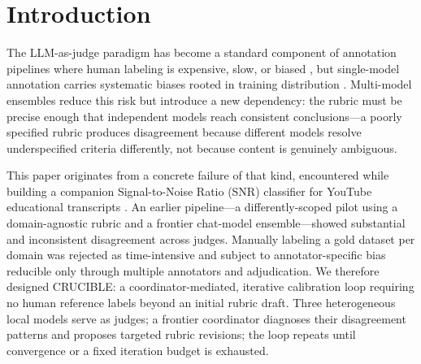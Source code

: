 \documentclass[letterpaper]{article}
\begin{document}
\begin{abstract}
further interventions---porting the calibrated rubric to a frontier judge, and
adding a reasoning step before the label---each move the optimized metric
without moving agreement with the human reference, and a reasoning step alone
moves it by $+11.6$ points. These results
locate CRUCIBLE's value not in raising raw agreement, and not in match against
human consensus, but in diagnosing whether residual disagreement is
rubric-fixable, capability-bounded, or prevalence-dominated---and in the
accompanying warning that a stopping rule defined on an uncorrected agreement
metric will terminate before agreement has been achieved. For a safety-critical
evaluation pipeline, this is the risk-relevant contribution: an operator
reading 81.7\% agreement as convergence is reading a number whose floor is
66.7\%.
\end{abstract}

\begin{links}
\end{links}

\section{Introduction}

The LLM-as-judge paradigm has become a standard component of annotation
pipelines where human labeling is expensive, slow, or biased
\citep{zheng2023judging}, but single-model annotation carries systematic
biases rooted in training distribution \citep{thakur2024judging}.
Multi-model ensembles reduce this risk but introduce a new dependency: the
rubric must be precise enough that independent models reach consistent
conclusions---a poorly specified rubric produces disagreement because
different models resolve underspecified criteria differently, not because
content is genuinely ambiguous.

This paper originates from a concrete failure of that kind, encountered
while building a companion Signal-to-Noise Ratio (SNR) classifier for
YouTube educational transcripts \citep{das2026snr}. An earlier pipeline---a differently-scoped pilot using a domain-agnostic
rubric and a frontier chat-model ensemble---showed substantial and
inconsistent disagreement across judges. Manually labeling a gold dataset per
domain was rejected as time-intensive and subject to annotator-specific bias
reducible only through multiple annotators and adjudication. We therefore designed CRUCIBLE: a coordinator-mediated,
iterative calibration loop requiring no human reference labels beyond an
initial rubric draft. Three heterogeneous local models serve as judges; a
frontier coordinator diagnoses their disagreement patterns and proposes
targeted rubric revisions; the loop repeats until convergence or a fixed
iteration budget is exhausted.
\end{document}
